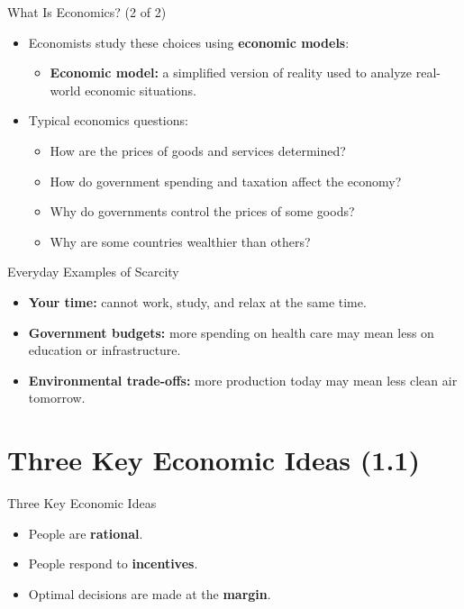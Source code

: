 \documentclass[aspectratio=169]{beamer}
\begin{document}
\begin{frame}{What Is Economics? (2 of 2)}
\transfade
\begin{itemize}[<+->]
  \item Economists study these choices using \textbf{economic models}:
  \begin{itemize}[<+->]
    \item \textbf{Economic model:} a simplified version of reality used to analyze real-world economic situations.
  \end{itemize}
  \item Typical economics questions:
  \begin{itemize}[<+->]
    \item How are the prices of goods and services determined?
    \item How do government spending and taxation affect the economy?
    \item Why do governments control the prices of some goods?
    \item Why are some countries wealthier than others?
  \end{itemize}
\end{itemize}
\end{frame}

\begin{frame}{Everyday Examples of Scarcity}
\transfade
\begin{itemize}[<+->]
  \item \textbf{Your time:} cannot work, study, and relax at the same time.
  \item \textbf{Government budgets:} more spending on health care may mean less on education or infrastructure.
  \item \textbf{Environmental trade-offs:} more production today may mean less clean air tomorrow.
\end{itemize}
\end{frame}



\section{Three Key Economic Ideas (1.1)}

\begin{frame}{Three Key Economic Ideas}
\transfade
\begin{itemize}[<+->]
  \item People are \textbf{rational}.
  \item People respond to \textbf{incentives}.
  \item Optimal decisions are made at the \textbf{margin}.
\end{itemize}
\end{frame}
\end{document}
